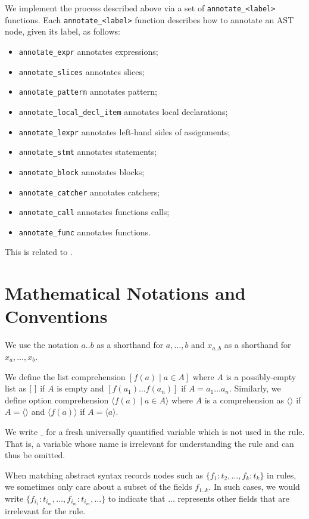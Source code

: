 \documentclass{book}
\newcommand\Ignore[0]{\texttt{\_}}
\begin{document}
We implement the process described above via a set of
\texttt{annotate\_<label>} functions. Each \texttt{annotate\_<label>}
function describes how to annotate an AST node, given its label, as follows:\begin{itemize}
\item \texttt{annotate\_expr} annotates expressions;
\item \texttt{annotate\_slices} annotates slices;
\item \texttt{annotate\_pattern} annotates pattern;
\item \texttt{annotate\_local\_decl\_item} annotates local declarations;
\item \texttt{annotate\_lexpr} annotates left-hand sides of assignments;
\item \texttt{annotate\_stmt} annotates statements;
\item \texttt{annotate\_block} annotates blocks;
\item \texttt{annotate\_catcher} annotates catchers;
\item \texttt{annotate\_call} annotates functions calls;
\item \texttt{annotate\_func} annotates functions.
\end{itemize}

This is related to .

\section{Mathematical Notations and Conventions}

We use the notation $a..b$ as a shorthand for $a,\ldots,b$ and $x_{a..b}$ as a shorthand for $x_a,\ldots,x_b$.

We define the list comprehension $[f(a) \;|\; a \in A]$ where $A$ is a possibly-empty list as $[\ ]$ if $A$ is empty and $[f(a_1) \ldots f(a_n)]$ if $A=a_1 \ldots a_n$.
Similarly, we define option comprehension $\langle f(a) \;|\; a \in A\rangle$ where $A$ is a comprehension as $\langle\rangle$ if $A=\langle\rangle$
and $\langle f(a)\rangle$ if $A=\langle a \rangle$.

We write $\Ignore$ for a fresh universally quantified variable which is not used in the rule. That is, a variable whose name is irrelevant for understanding the rule and can thus be omitted.

When matching abstract syntax records nodes such as $\{f_1:t_2,\ldots,f_k:t_k\}$ in rules, we sometimes only care about a subset of the fields $f_{1..k}$.
In such cases, we would write $\{f_{i_1}:t_{i_m},\ldots,f_{i_m}:t_{i_m},\ldots\}$ to indicate that $\ldots$ represents other fields that are irrelevant for the rule.
\end{document}
